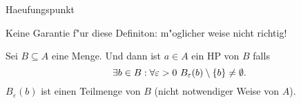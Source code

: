 \documentclass[class=article, crop=false]{standalone}
\begin{document}
\begin{zettel}{Haeufungspunkt}
\begin{flashcard}
    \begin{definition}[Haeufungspunkt]
        Keine Garantie f"ur diese Definiton: m"oglicher weise nicht richtig!

        Sei $B \subseteq A$ eine Menge. Und  dann ist $a \in  A$ ein HP von $B$ falls
        \[
           \exists b \in  B : \forall \varepsilon > 0 \ B_{\varepsilon}(b) \setminus \set{b} \neq \emptyset
        .\]
        $B_{\varepsilon}(b)$ ist einen Teilmenge von $B$ (nicht notwendiger Weise von $A$).
    \end{definition}


\end{flashcard}
\end{zettel}
\end{document}
